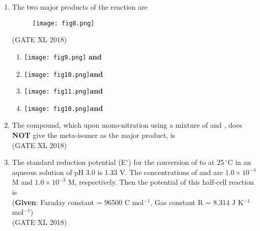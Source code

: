\documentclass[14pt]{extarticle}
\begin{document}
\begin{flushleft}
\begin{enumerate}
\item The two major products of the reaction are
\begin{figure}[H]
    \centering 
    \texttt{[image: fig8.png]}
    \caption{}
    \label{fig:q10} 
\end{figure}
\hfill (GATE XL 2018)\\
\begin{enumerate}
\item \texttt{[image: fig9.png]} \textbf{and} 
\item \texttt{[image: fig10.png]}\textbf{and} 
\item \texttt{[image: fig11.png]}\textbf{and} 
\item \texttt{[image: fig10.png]}\textbf{and} 
\end{enumerate}

\item The compound, which upon mono-nitration using a mixture of  and , does \textbf{NOT} give the meta-isomer as the major product, is \\
\hfill (GATE XL 2018)\\
\clearpage
\begin{enumerate}
\end{enumerate}

\item The standard reduction potential (E$^\circ$) for the conversion of  to  at 25\,$^\circ$C in an aqueous solution of pH 3.0 is 1.33 V. The concentrations of  and  are $1.0 \times 10^{-4}$ M and $1.0 \times 10^{-3}$ M, respectively. Then the potential of this half-cell reaction is \\
(\textbf{Given}: Faraday constant = 96500 C mol$^{-1}$, Gas constant R = 8.314 J K$^{-1}$ mol$^{-1}$)\\
    \hfill (GATE XL 2018)\\
\begin{enumerate}
\end{enumerate}


\end{enumerate}
\end{flushleft}
\end{document}
